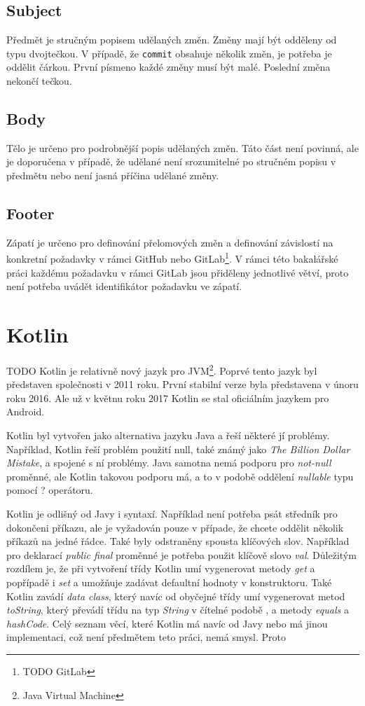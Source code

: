     \subsection{Subject}
        Předmět je stručným popisem udělaných změn. Změny mají být odděleny od typu dvojtečkou. V případě, že \verb|commit| obsahuje několik změn, je potřeba je oddělit čárkou. První písmeno každé změny musí být malé. Poslední změna nekončí tečkou.
    
    \subsection{Body}
        Tělo je určeno pro podrobnější popis udělaných změn. Táto část není povinná, ale je doporučena v případě, že udělané není srozumitelné po stručném popisu v předmětu nebo není jasná příčina udělané změny.
    
    \subsection{Footer}
        Zápatí je určeno pro definování přelomových změn a definování závislostí na konkretní požadavky v rámci GitHub nebo GitLab\footnote{TODO GitLab}. V rámci této bakalářské práci každému požadavku v rámci GitLab jsou přiděleny jednotlivé větví, proto není potřeba uvádět identifikátor požadavku ve zápatí.
    
\section{Kotlin}\label{resere:kotlin}
    TODO
    Kotlin je relativně nový jazyk pro JVM\footnote{Java Virtual Machine}. Poprvé tento jazyk byl představen společnosti v 2011 roku. První stabilní verze byla představena v únoru roku 2016. Ale už v květnu roku 2017 Kotlin se stal oficiálním jazykem pro Android.
    
    Kotlin byl vytvořen jako alternativa jazyku Java a řeší některé jí problémy. Například, Kotlin řeší problém použití null, také známý jako \textit{The Billion Dollar Mistake}\cite{theBDM}, a spojené s ní problémy. Java samotna nemá podporu pro \textit{not-null} proměnné, ale Kotlin takovou podporu má, a to v podobě oddělení \textit{nullable} typu pomocí ? operátoru.
    
    Kotlin je odlišný od Javy i syntaxí. Například není potřeba psát středník pro dokončeni příkazu, ale je vyžadován pouze v případe, že chcete oddělit několik příkazů na jedné řádce. Také byly odstraněny spousta klíčových slov. Například pro deklarací \textit{public final} proměnné je potřeba použit klíčově slovo \textit{val}. Důležitým rozdílem je, že při vytvoření třídy Kotlin umí vygenerovat metody \textit{get} a popřípadě i \textit{set} a umožňuje zadávat defaultní hodnoty v konstruktoru. Také Kotlin zavádí \textit{data class}, který navíc od obyčejné třídy umí vygenerovat metod \textit{toString}, který převádí třídu na typ \textit{String} v čítelné podobě \cite{Priklad vygenerovane tridy}, a metody \textit{equals} a \textit{hashCode}. Celý seznam věcí, které Kotlin má navíc od Javy nebo má jinou implementaci, což není předmětem teto práci, nemá smysl. Proto 
    
